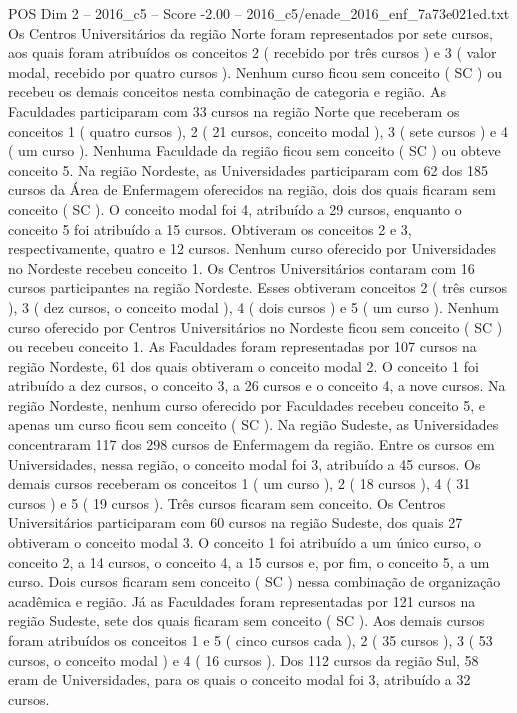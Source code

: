 \begin{textsample}{POS Dim 2 – 2016\_c5 – Score -2.00 – 2016\_c5/enade\_2016\_enf\_7a73e021ed.txt}
Os Centros Universitários da região Norte foram representados por sete cursos, aos quais foram atribuídos os conceitos 2 ( recebido por três cursos ) e 3 ( valor modal, recebido por quatro cursos ).
Nenhum curso ficou sem conceito ( SC ) ou recebeu os demais conceitos nesta combinação de categoria e região.
As Faculdades participaram com 33 cursos na região Norte que receberam os conceitos 1 ( quatro cursos ), 2 ( 21 cursos, conceito modal ), 3 ( sete cursos ) e 4 ( um curso ).
Nenhuma Faculdade da região ficou sem conceito ( SC ) ou obteve conceito 5.
Na região Nordeste, as Universidades participaram com 62 dos 185 cursos da Área de Enfermagem oferecidos na região, dois dos quais ficaram sem conceito ( SC ).
O conceito modal foi 4, atribuído a 29 cursos, enquanto o conceito 5 foi atribuído a 15 cursos.
Obtiveram os conceitos 2 e 3, respectivamente, quatro e 12 cursos.
Nenhum curso oferecido por Universidades no Nordeste recebeu conceito 1.
Os Centros Universitários contaram com 16 cursos participantes na região Nordeste.
Esses obtiveram conceitos 2 ( três cursos ), 3 ( dez cursos, o conceito modal ), 4 ( dois cursos ) e 5 ( um curso ).
Nenhum curso oferecido por Centros Universitários no Nordeste ficou sem conceito ( SC ) ou recebeu conceito 1.
As Faculdades foram representadas por 107 cursos na região Nordeste, 61 dos quais obtiveram o conceito modal 2.
O conceito 1 foi atribuído a dez cursos, o conceito 3, a 26 cursos e o conceito 4, a nove cursos.
Na região Nordeste, nenhum curso oferecido por Faculdades recebeu conceito 5, e apenas um curso ficou sem conceito ( SC ).
Na região Sudeste, as Universidades concentraram 117 dos 298 cursos de Enfermagem da região.
Entre os cursos em Universidades, nessa região, o conceito modal foi 3, atribuído a 45 cursos.
Os demais cursos receberam os conceitos 1 ( um curso ), 2 ( 18 cursos ), 4 ( 31 cursos ) e 5 ( 19 cursos ).
Três cursos ficaram sem conceito.
Os Centros Universitários participaram com 60 cursos na região Sudeste, dos quais 27 obtiveram o conceito modal 3.
O conceito 1 foi atribuído a um único curso, o conceito 2, a 14 cursos, o conceito 4, a 15 cursos e, por fim, o conceito 5, a um curso.
Dois cursos ficaram sem conceito ( SC ) nessa combinação de organização acadêmica e região.
Já as Faculdades foram representadas por 121 cursos na região Sudeste, sete dos quais ficaram sem conceito ( SC ).
Aos demais cursos foram atribuídos os conceitos 1 e 5 ( cinco cursos cada ), 2 ( 35 cursos ), 3 ( 53 cursos, o conceito modal ) e 4 ( 16 cursos ).
Dos 112 cursos da região Sul, 58 eram de Universidades, para os quais o conceito modal foi 3, atribuído a 32 cursos.

\end{textsample}
